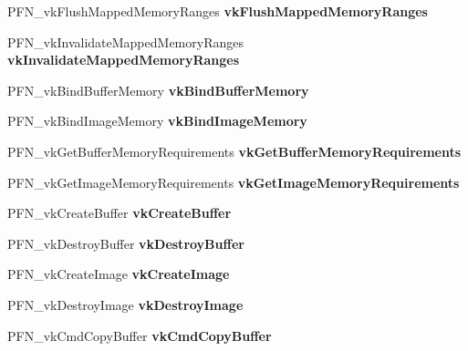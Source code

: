 \begin{DoxyCompactItemize}
P\+F\+N\+\_\+vk\+Flush\+Mapped\+Memory\+Ranges {\bfseries vk\+Flush\+Mapped\+Memory\+Ranges}
\item 
\mbox{\label{structVmaVulkanFunctions_a5c1093bc32386a8060c37c9f282078a1}} 
P\+F\+N\+\_\+vk\+Invalidate\+Mapped\+Memory\+Ranges {\bfseries vk\+Invalidate\+Mapped\+Memory\+Ranges}
\item 
\mbox{\label{structVmaVulkanFunctions_a94fc4f3a605d9880bb3c0ba2c2fc80b2}} 
P\+F\+N\+\_\+vk\+Bind\+Buffer\+Memory {\bfseries vk\+Bind\+Buffer\+Memory}
\item 
\mbox{\label{structVmaVulkanFunctions_a1338d96a128a5ade648b8d934907c637}} 
P\+F\+N\+\_\+vk\+Bind\+Image\+Memory {\bfseries vk\+Bind\+Image\+Memory}
\item 
\mbox{\label{structVmaVulkanFunctions_a5b92901df89a4194b0d12f6071d4d143}} 
P\+F\+N\+\_\+vk\+Get\+Buffer\+Memory\+Requirements {\bfseries vk\+Get\+Buffer\+Memory\+Requirements}
\item 
\mbox{\label{structVmaVulkanFunctions_a475f6f49f8debe4d10800592606d53f4}} 
P\+F\+N\+\_\+vk\+Get\+Image\+Memory\+Requirements {\bfseries vk\+Get\+Image\+Memory\+Requirements}
\item 
\mbox{\label{structVmaVulkanFunctions_ae8084315a25006271a2edfc3a447519f}} 
P\+F\+N\+\_\+vk\+Create\+Buffer {\bfseries vk\+Create\+Buffer}
\item 
\mbox{\label{structVmaVulkanFunctions_a7e054606faddb07f0e8556f3ed317d45}} 
P\+F\+N\+\_\+vk\+Destroy\+Buffer {\bfseries vk\+Destroy\+Buffer}
\item 
\mbox{\label{structVmaVulkanFunctions_a23ebe70be515b9b5010a1d691200e325}} 
P\+F\+N\+\_\+vk\+Create\+Image {\bfseries vk\+Create\+Image}
\item 
\mbox{\label{structVmaVulkanFunctions_a90b898227039b1dcb3520f6e91f09ffa}} 
P\+F\+N\+\_\+vk\+Destroy\+Image {\bfseries vk\+Destroy\+Image}
\item 
\mbox{\label{structVmaVulkanFunctions_ae5c0db8c89a3b82593dc16aa6a49fa3a}} 
P\+F\+N\+\_\+vk\+Cmd\+Copy\+Buffer {\bfseries vk\+Cmd\+Copy\+Buffer}
\end{DoxyCompactItemize}


